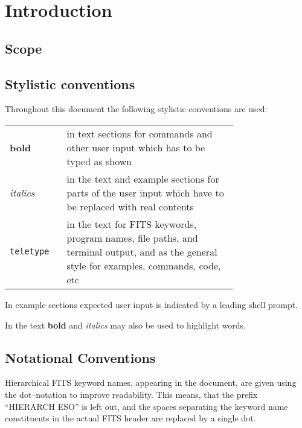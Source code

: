 \section{Introduction}
\label{sec:introduction}

\subsection{Scope}
\label{sec:scope}



\subsection{Stylistic conventions}
\label{sec:style}

Throughout this document the following stylistic conventions are used:

\begin{tabular}{lp{0.75\linewidth}}
\textbf{bold}     & in text sections for commands and other
                    user input which has to be typed as shown \\
\textit{italics}  & in the text and example sections for parts of the user
                    input which have to be replaced with real contents \\
\texttt{teletype} & in the text for FITS keywords, program names, file paths,
                    and terminal output, and as the general style for examples,
                    commands, code, etc \\
\end{tabular}

In example sections expected user input is indicated by a leading shell
prompt.

In the text \textbf{bold} and \textit{italics} may also be used to highlight
words.

\subsection{Notational Conventions}
\label{sec:notation}

Hierarchical FITS keyword names, appearing in the document, are given using the
dot--notation to improve readability. This means, that the prefix ``HIERARCH
ESO'' is left out, and the spaces separating the keyword name constituents in
the actual FITS header are replaced by a single dot.

